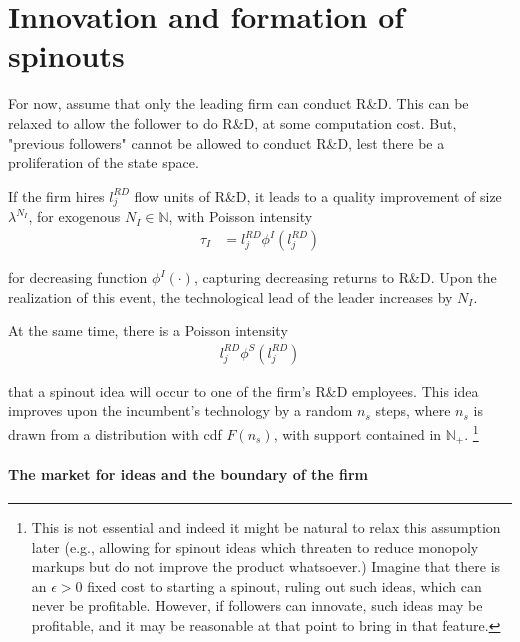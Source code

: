 \documentclass[12pt,english]{article}
\theoremstyle{remark}
\begin{document}
\section{Innovation and formation of spinouts}

For now, assume that only the leading firm can conduct R\&D. This can be relaxed to allow the follower to do R\&D, at some computation cost. But, "previous followers" cannot be allowed to conduct R\&D, lest there be a proliferation of the state space. 

If the firm hires $l_j^{RD}$ flow units of R\&D, it leads to a quality improvement of size $\lambda^{N_I}$, for exogenous $N_I \in \mathbb{N}$,  with Poisson intensity
\begin{align*}
	\tau_I &= l_j^{RD} \phi^I(l_j^{RD})
\end{align*}

for decreasing function $\phi^I(\cdot)$, capturing decreasing returns to R\&D. Upon the realization of this event, the technological lead of the leader increases by $N_I$.  

At the same time, there is a Poisson intensity  
\begin{align*}
	l_j^{RD} \phi^S(l_j^{RD})
\end{align*}

that a spinout idea will occur to one of the firm's R\&D employees. This idea improves upon the incumbent's technology by a random $n_s$ steps, where $n_s$ is drawn from a distribution with cdf $F(n_s)$, with support contained in $\mathbb{N}_+$. \footnote{This is not essential and indeed it might be natural to relax this assumption later (e.g., allowing for spinout ideas which threaten to reduce monopoly markups but do not improve the product whatsoever.) Imagine that there is an $\epsilon > 0$ fixed cost to starting a spinout, ruling out such ideas, which can never be profitable. However, if followers can innovate, such ideas may be profitable, and it may be reasonable at that point to bring in that feature.} 

\paragraph{The market for ideas and the boundary of the firm}
\end{document}
